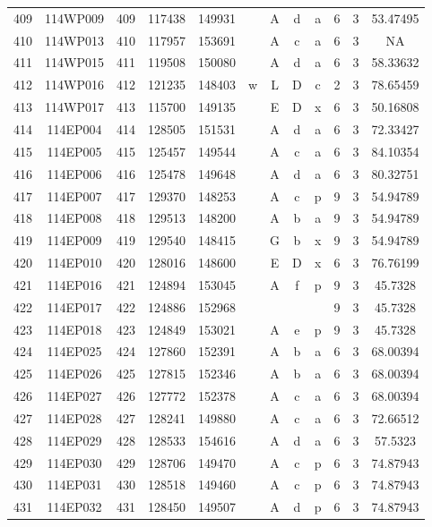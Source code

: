 \begin{tabular}{|*{12}{c|}}
409 & 114WP009 & 409 & 117438 & 149931 &  & A & d & a & 6 & 3 & 53.47495 \\ 
410 & 114WP013 & 410 & 117957 & 153691 &  & A & c & a & 6 & 3 & NA \\ 
411 & 114WP015 & 411 & 119508 & 150080 &  & A & d & a & 6 & 3 & 58.33632 \\ 
412 & 114WP016 & 412 & 121235 & 148403 & w & L & D & c & 2 & 3 & 78.65459 \\ 
413 & 114WP017 & 413 & 115700 & 149135 &  & E & D & x & 6 & 3 & 50.16808 \\ 
414 & 114EP004 & 414 & 128505 & 151531 &  & A & d & a & 6 & 3 & 72.33427 \\ 
415 & 114EP005 & 415 & 125457 & 149544 &  & A & c & a & 6 & 3 & 84.10354 \\ 
416 & 114EP006 & 416 & 125478 & 149648 &  & A & d & a & 6 & 3 & 80.32751 \\ 
417 & 114EP007 & 417 & 129370 & 148253 &  & A & c & p & 9 & 3 & 54.94789 \\ 
418 & 114EP008 & 418 & 129513 & 148200 &  & A & b & a & 9 & 3 & 54.94789 \\ 
419 & 114EP009 & 419 & 129540 & 148415 &  & G & b & x & 9 & 3 & 54.94789 \\ 
420 & 114EP010 & 420 & 128016 & 148600 &  & E & D & x & 6 & 3 & 76.76199 \\ 
421 & 114EP016 & 421 & 124894 & 153045 &  & A & f & p & 9 & 3 & 45.7328 \\ 
422 & 114EP017 & 422 & 124886 & 152968 &  &  &  &  & 9 & 3 & 45.7328 \\ 
423 & 114EP018 & 423 & 124849 & 153021 &  & A & e & p & 9 & 3 & 45.7328 \\ 
424 & 114EP025 & 424 & 127860 & 152391 &  & A & b & a & 6 & 3 & 68.00394 \\ 
425 & 114EP026 & 425 & 127815 & 152346 &  & A & b & a & 6 & 3 & 68.00394 \\ 
426 & 114EP027 & 426 & 127772 & 152378 &  & A & c & a & 6 & 3 & 68.00394 \\ 
427 & 114EP028 & 427 & 128241 & 149880 &  & A & c & a & 6 & 3 & 72.66512 \\ 
428 & 114EP029 & 428 & 128533 & 154616 &  & A & d & a & 6 & 3 & 57.5323 \\ 
429 & 114EP030 & 429 & 128706 & 149470 &  & A & c & p & 6 & 3 & 74.87943 \\ 
430 & 114EP031 & 430 & 128518 & 149460 &  & A & c & p & 6 & 3 & 74.87943 \\ 
431 & 114EP032 & 431 & 128450 & 149507 &  & A & d & p & 6 & 3 & 74.87943 \\ 

\end{tabular}
